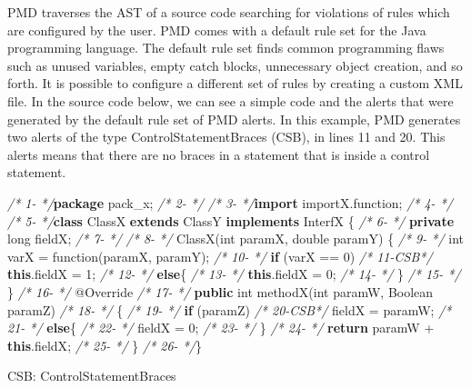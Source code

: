 \documentclass[
]{article}
\newenvironment{Shaded}{\begin{snugshade}}{\end{snugshade}}
\newcommand{\AttributeTok}[1]{\textcolor[rgb]{0.77,0.63,0.00}{#1}}
\newcommand{\BuiltInTok}[1]{#1}
\newcommand{\CommentTok}[1]{\textcolor[rgb]{0.56,0.35,0.01}{\textit{#1}}}
\newcommand{\DataTypeTok}[1]{\textcolor[rgb]{0.13,0.29,0.53}{#1}}
\newcommand{\DecValTok}[1]{\textcolor[rgb]{0.00,0.00,0.81}{#1}}
\newcommand{\FunctionTok}[1]{\textcolor[rgb]{0.00,0.00,0.00}{#1}}
\newcommand{\ImportTok}[1]{#1}
\newcommand{\KeywordTok}[1]{\textcolor[rgb]{0.13,0.29,0.53}{\textbf{#1}}}
\newcommand{\NormalTok}[1]{#1}
\begin{document}
PMD traverses the AST of a source code searching for violations of rules
which are configured by the user. PMD comes with a default rule set for
the Java programming language. The default rule set finds common
programming flaws such as unused variables, empty catch blocks,
unnecessary object creation, and so forth. It is possible to configure a
different set of rules by creating a custom XML file. In the source code
below, we can see a simple code and the alerts that were generated by
the default rule set of PMD alerts. In this example, PMD generates two
alerts of the type ControlStatementBraces (CSB), in lines 11 and 20.
This alerts means that there are no braces in a statement that is inside
a control statement.

\small

\normalsize

\newpage

\small

\begin{Shaded}
\begin{Highlighting}[]
\CommentTok{/*  1-   */}\KeywordTok{package}\ImportTok{ pack_x;}
\CommentTok{/*  2-   */}  
\CommentTok{/*  3-   */}\KeywordTok{import}\ImportTok{ importX.function;}
\CommentTok{/*  4-   */}
\CommentTok{/*  5-   */}\KeywordTok{class}\NormalTok{ ClassX }\KeywordTok{extends}\NormalTok{ ClassY }\KeywordTok{implements}\NormalTok{ InterfX \{}
\CommentTok{/*  6-   */}    \KeywordTok{private} \DataTypeTok{long}\NormalTok{ fieldX;}
\CommentTok{/*  7-   */}    
\CommentTok{/*  8-   */}    \FunctionTok{ClassX}\NormalTok{(}\DataTypeTok{int}\NormalTok{ paramX, }\DataTypeTok{double}\NormalTok{ paramY) \{}
\CommentTok{/*  9-   */}        \DataTypeTok{int}\NormalTok{ varX = }\FunctionTok{function}\NormalTok{(paramX, paramY);}
\CommentTok{/* 10-   */}        \KeywordTok{if}\NormalTok{ (varX == }\DecValTok{0}\NormalTok{)}
\CommentTok{/* 11-CSB*/}            \KeywordTok{this}\NormalTok{.}\FunctionTok{fieldX}\NormalTok{ = }\DecValTok{1}\NormalTok{;}
\CommentTok{/* 12-   */}        \KeywordTok{else}\NormalTok{\{}
\CommentTok{/* 13-   */}            \KeywordTok{this}\NormalTok{.}\FunctionTok{fieldX}\NormalTok{ = }\DecValTok{0}\NormalTok{;}
\CommentTok{/* 14-   */}\NormalTok{     \}}
\CommentTok{/* 15-   */}\NormalTok{    \}}
\CommentTok{/* 16-   */}    \AttributeTok{@Override}
\CommentTok{/* 17-   */}    \KeywordTok{public} \DataTypeTok{int} \FunctionTok{methodX}\NormalTok{(}\DataTypeTok{int}\NormalTok{ paramW, }\BuiltInTok{Boolean}\NormalTok{ paramZ)}
\CommentTok{/* 18-   */}\NormalTok{    \{}
\CommentTok{/* 19-   */}        \KeywordTok{if}\NormalTok{ (paramZ)}
\CommentTok{/* 20-CSB*/}\NormalTok{            fieldX = paramW;}
\CommentTok{/* 21-   */}        \KeywordTok{else}\NormalTok{\{}
\CommentTok{/* 22-   */}\NormalTok{            fieldX = }\DecValTok{0}\NormalTok{;}
\CommentTok{/* 23-   */}\NormalTok{     \}}
\CommentTok{/* 24-   */}        \KeywordTok{return}\NormalTok{ paramW + }\KeywordTok{this}\NormalTok{.}\FunctionTok{fieldX}\NormalTok{;}
\CommentTok{/* 25-   */}\NormalTok{     \}}
\CommentTok{/* 26-   */}\NormalTok{\}  }


\NormalTok{CSB: ControlStatementBraces}
\end{Highlighting}
\end{Shaded}
\end{document}
